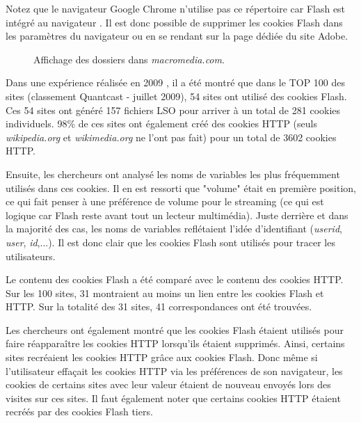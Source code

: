 Notez que le navigateur Google Chrome n'utilise pas ce répertoire car Flash est intégré au navigateur \cite{flash_chrome}. Il est donc possible de supprimer les cookies Flash dans les paramètres du navigateur ou en se rendant sur la page dédiée du site Adobe.
\newline

\begin{figure}[h]
	\centering
	
	\caption{\label{ls_macromedia.com}Affichage des dossiers dans \textit{macromedia.com}.}
\end{figure}

Dans une expérience réalisée en 2009 \cite{conf/aaaiss/SoltaniCMTH10}, il a été montré que dans le TOP 100 des sites (classement Quantcast - juillet 2009), 54 sites ont utilisé des cookies Flash. Ces 54 sites ont généré 157 fichiers LSO pour arriver à un total de 281 cookies individuels. 98\% de ces sites ont également créé des cookies HTTP (seuls \textit{wikipedia.org} et \textit{wikimedia.org} ne l'ont pas fait) pour un total de 3602 cookies HTTP.

Ensuite, les chercheurs ont analysé les noms de variables les plus fréquemment utilisés dans ces cookies. Il en est ressorti que "volume" était en première position, ce qui fait penser à une préférence de volume pour le streaming (ce qui est logique car Flash reste avant tout un lecteur multimédia). Juste derrière et dans la majorité des cas, les noms de variables reflétaient l'idée d'identifiant (\textit{userid}, \textit{user}, \textit{id},...). Il est donc clair que les cookies Flash sont utilisés pour tracer les utilisateurs.

Le contenu des cookies Flash a été comparé avec le contenu des cookies HTTP. Sur les 100 sites, 31 montraient au moins un lien entre les cookies Flash et HTTP. Sur la totalité des 31 sites, 41 correspondances ont été trouvées.

Les chercheurs ont également montré que les cookies Flash étaient utilisés pour faire réapparaître les cookies HTTP lorsqu'ils étaient supprimés. Ainsi, certains sites recréaient les cookies HTTP grâce aux cookies Flash. Donc même si l'utilisateur effaçait les cookies HTTP via les préférences de son navigateur, les cookies de certains sites avec leur valeur étaient de nouveau envoyés lors des visites sur ces sites. Il faut également noter que certains cookies HTTP étaient recréés par des cookies Flash tiers.
\newline

